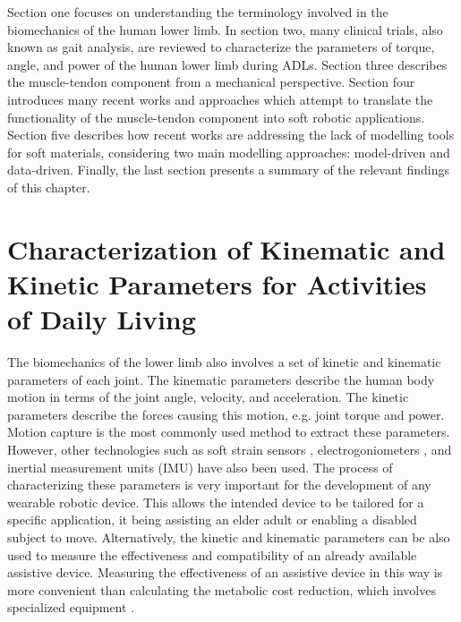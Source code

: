 Section one focuses on understanding the terminology involved in the biomechanics of the human lower limb. In section two, many clinical trials, also known as gait analysis, are reviewed to characterize the parameters of torque, angle, and power of the human lower limb during ADLs. Section three describes the muscle-tendon component from a mechanical perspective. Section four introduces many recent works and approaches which attempt to translate the functionality of the muscle-tendon component into soft robotic applications. Section five describes how recent works are addressing the lack of modelling tools for soft materials, considering two main modelling approaches: model-driven and data-driven. Finally, the last section presents a summary of the relevant findings of this chapter.




\section{Characterization of Kinematic and Kinetic Parameters for Activities of Daily Living} \label{sec:characterizationKKP}

The biomechanics of the lower limb also involves a set of kinetic and kinematic parameters of each joint. The kinematic parameters describe the human body motion in terms of the joint angle, velocity, and acceleration. The kinetic
parameters describe the forces causing this motion, e.g. joint torque and power. Motion capture is the most commonly used method to extract these parameters. However, other technologies such as soft strain sensors \cite{mengucc2014wearable}, electrogoniometers \cite{wu2011electromyography}, and inertial measurement units (IMU) have also been used. The process of characterizing these parameters is very important for the development of any wearable robotic device. This allows the intended device to be tailored for a specific application, it being assisting an elder adult or enabling a disabled subject to move. Alternatively, the kinetic and kinematic parameters can be also used to measure the effectiveness and compatibility of an already available assistive device. Measuring the effectiveness of an assistive device in this way is more convenient than calculating the metabolic cost reduction, which involves specialized equipment \cite{panizzolo2016biologically}. 

